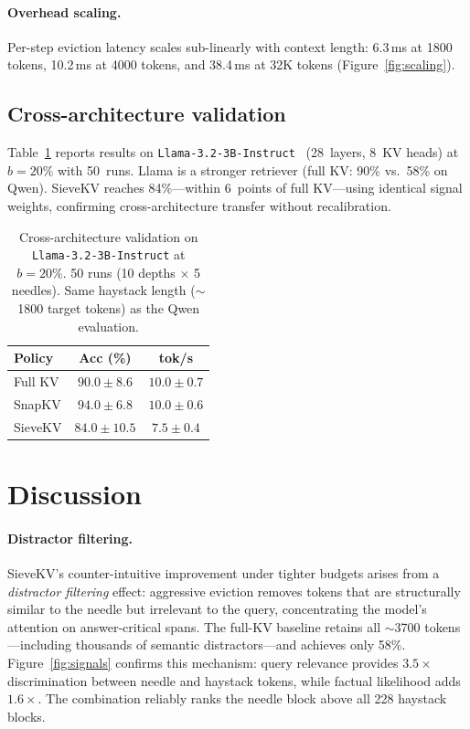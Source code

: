 \documentclass[runningheads]{llncs}
\begin{document}
\paragraph{Overhead scaling.}
Per-step eviction latency scales sub-linearly with context length:
6.3\,ms at 1800 tokens, 10.2\,ms at 4000 tokens, and 38.4\,ms at 32K tokens
(Figure~\ref{fig:scaling}).

\subsection{Cross-architecture validation}
\label{sec:cross}

Table~\ref{tab:llama} reports results on
\texttt{Llama-3.2-3B-Instruct}~\cite{meta2024llama32}
(28~layers, 8~KV heads) at $b{=}20\%$ with 50~runs.
Llama is a stronger retriever (full KV: 90\% vs.\ 58\% on Qwen).
SieveKV reaches 84\%---within 6~points of full KV---using
identical signal weights, confirming cross-architecture transfer
without recalibration.

\begin{table}[htbp]
\caption{Cross-architecture validation on \texttt{Llama-3.2-3B-Instruct}
at $b{=}20\%$. 50 runs (10 depths $\times$ 5 needles).
Same haystack length (${\sim}$1800 target tokens) as the Qwen evaluation.}
\label{tab:llama}
\centering
\begin{tabular}{lcc}
\toprule
Policy & Acc (\%) & tok/s \\
\midrule
Full KV       & $90.0\pm8.6$ & $10.0\pm0.7$ \\
SnapKV        & $94.0\pm6.8$ & $10.0\pm0.6$ \\
SieveKV  & $84.0\pm10.5$ & $7.5\pm0.4$ \\
\bottomrule
\end{tabular}
\end{table}

\section{Discussion}
\label{sec:discussion}

\paragraph{Distractor filtering.}
SieveKV's counter-intuitive improvement under tighter budgets
arises from a \emph{distractor filtering} effect: aggressive eviction
removes tokens that are structurally similar to the needle but
irrelevant to the query, concentrating the model's attention on
answer-critical spans.
The full-KV baseline retains all ${\sim}$3700 tokens---including
thousands of semantic distractors---and achieves only 58\%.
Figure~\ref{fig:signals} confirms this mechanism: query relevance
provides $3.5{\times}$ discrimination between needle and haystack
tokens, while factual likelihood adds $1.6{\times}$.
The combination reliably ranks the needle block above all 228
haystack blocks.
\end{document}
